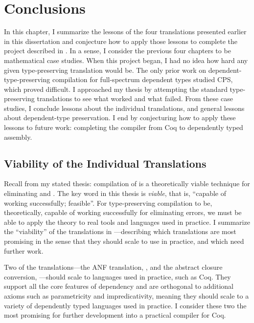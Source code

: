 \chapter{Conclusions}
\label{chp:conclusions}
In this chapter, I summarize the lessons of the four translations presented
earlier in this dissertation and conjecture how to apply those lessons to
complete the project described in .
In a sense, I consider the previous four chapters to be mathematical case
studies.
When this project began, I had no idea how hard any given type-preserving
translation would be.
The only prior work on dependent-type-preserving compilation for full-spectrum
dependent types studied CPS, which proved difficult.
I approached my thesis by attempting the standard type-preserving translations
to see what worked and what failed.
From these case studies, I conclude lessons about the individual translations,
and general lessons about dependent-type preservation.
I end by conjecturing how to apply these lessons to future work: completing the
compiler from Coq to dependently typed assembly.

\section{Viability of the Individual Translations}
\FigViability
Recall from  my stated thesis:
 compilation of  is a theoretically
viable technique for eliminating  and .
The key word in this thesis is \emph{viable}, that is, ``capable of working
successfully; feasible''.
For type-preserving compilation to be, theoretically, capable of working
successfully for eliminating errors, we must be able to apply the theory to real
tools and languages used in practice.
I summarize the ``viability'' of the translations in
---describing which translations are most
promising in the sense that they should scale to use in practice, and which
need further work.

Two of the translations---the ANF translation, , and the
abstract closure conversion, ---should scale to languages
used in practice, such as Coq.
They support all the core features of dependency and are orthogonal to
additional axioms such as parametricity and impredicativity, meaning they should
scale to a variety of dependently typed languages used in practice.
I consider these two the most promising for further development into a practical
compiler for Coq.

